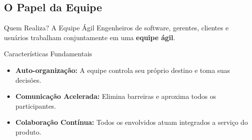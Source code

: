 \documentclass[aspectratio=169, 9pt]{beamer}
\begin{document}
\subsection{O Papel da Equipe}
\begin{frame}{Quem Realiza? A Equipe Ágil}
  Engenheiros de software, gerentes, clientes e usuários trabalham conjuntamente em uma \textbf{equipe ágil}.

  \vspace{0.3cm}
  \begin{block}{Características Fundamentais}
    \begin{itemize}
      \item \textbf{Auto-organização:} A equipe controla seu próprio destino e toma suas decisões.
      \item \textbf{Comunicação Acelerada:} Elimina barreiras e aproxima todos os participantes.
      \item \textbf{Colaboração Contínua:} Todos os envolvidos atuam integrados a serviço do produto.
    \end{itemize}
  \end{block}

  \vspace{0.3cm}
  \centering
\end{frame}
\end{document}
